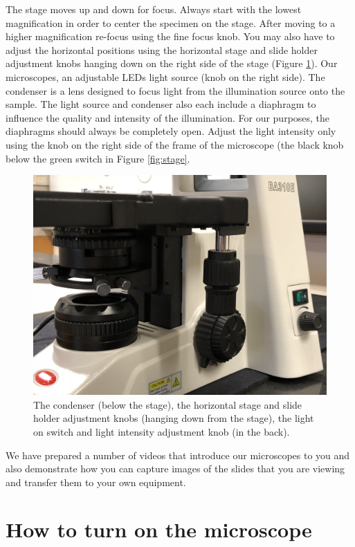 The stage moves up and down for focus. Always start with the lowest
magnification in order to center the specimen on the stage. After moving
to a higher magnification re-focus using the fine focus knob. You may
also have to adjust the horizontal positions using the horizontal stage
and slide holder adjustment knobs hanging down on the right side of the
stage (Figure \ref{fig:condenser}). Our microscopes, an adjustable LEDs
light source (knob on the right side). The condenser is a lens designed
to focus light from the illumination source onto the sample. The light
source and condenser also each include a diaphragm to influence the
quality and intensity of the illumination. For our purposes, the
diaphragms should always be completely open. Adjust the light intensity
only using the knob on the right side of the frame of the microscope
(the black knob below the green switch in Figure \ref{fig:stage}.

\begin{figure}

{\centering \includegraphics[width=0.7\linewidth]{./figures/microscope/condenser}

}

\caption{The condenser (below the stage), the horizontal stage and slide holder adjustment knobs (hanging down from the stage), the light on switch and light intensity adjustment knob (in the back).}\label{fig:condenser}
\end{figure}

We have prepared a number of videos that introduce our microscopes to
you and also demonstrate how you can capture images of the slides that
you are viewing and transfer them to your own equipment.

\section{How to turn on the
microscope}\label{how-to-turn-on-the-microscope}

